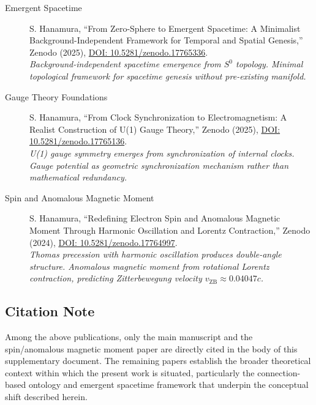 \documentclass[12pt,letterpaper]{article}
\begin{document}
\begin{description}
\item[Emergent Spacetime] S. Hanamura, ``From Zero-Sphere to Emergent Spacetime: A Minimalist Background-Independent Framework for Temporal and Spatial Genesis,'' Zenodo (2025), \href{https://doi.org/10.5281/zenodo.17765336}{DOI: 10.5281/zenodo.17765336}. \\
\textit{Background-independent spacetime emergence from $S^0$ topology. Minimal topological framework for spacetime genesis without pre-existing manifold.}

\item[Gauge Theory Foundations] S. Hanamura, ``From Clock Synchronization to Electromagnetism: A Realist Construction of U(1) Gauge Theory,'' Zenodo (2025), \href{https://doi.org/10.5281/zenodo.17765136}{DOI: 10.5281/zenodo.17765136}. \\
\textit{U(1) gauge symmetry emerges from synchronization of internal clocks. Gauge potential as geometric synchronization mechanism rather than mathematical redundancy.}

\item[Spin and Anomalous Magnetic Moment] S. Hanamura, ``Redefining Electron Spin and Anomalous Magnetic Moment Through Harmonic Oscillation and Lorentz Contraction,'' Zenodo (2024), \href{https://doi.org/10.5281/zenodo.17764997}{DOI: 10.5281/zenodo.17764997}. \\
\textit{Thomas precession with harmonic oscillation produces double-angle structure. Anomalous magnetic moment from rotational Lorentz contraction, predicting Zitterbewegung velocity $v_{\mathrm{ZB}} \approx 0.04047c$.}
\end{description}

\subsection*{Citation Note}

Among the above publications, only the main manuscript and the spin/anomalous magnetic moment paper are directly cited in the body of this supplementary document. The remaining papers establish the broader theoretical context within which the present work is situated, particularly the connection-based ontology and emergent spacetime framework that underpin the conceptual shift described herein.
\end{document}
